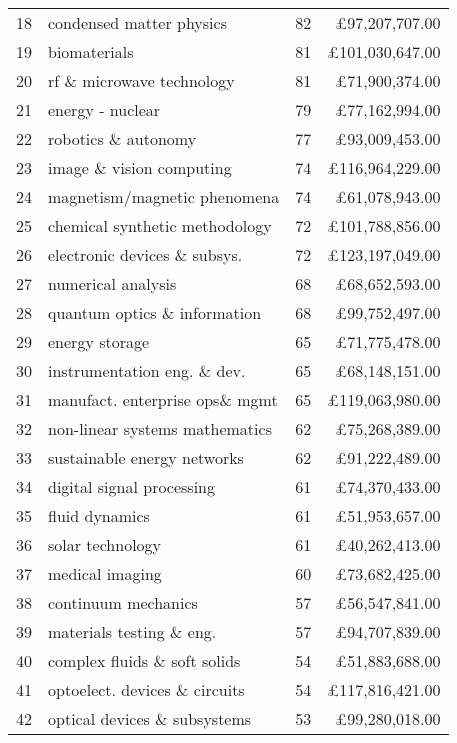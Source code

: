 \begin{spacing}{0.9}
\begin{longtable}[c]{r|>{\raggedleft\arraybackslash}m{6.5cm}|>{\raggedleft\arraybackslash}m{1.9cm}|r}
{18} & {condensed matter physics} & {82} & {\pounds97,207,707.00}\\
{19} & {biomaterials} & {81} & {\pounds101,030,647.00}\\
{20} & {rf \& microwave technology} & {81} & {\pounds71,900,374.00}\\
{21} & {energy - nuclear} & {79} & {\pounds77,162,994.00}\\
{22} & {robotics \& autonomy} & {77} & {\pounds93,009,453.00}\\
{23} & {image \& vision computing} & {74} & {\pounds116,964,229.00}\\
{24} & {magnetism/magnetic phenomena} & {74} & {\pounds61,078,943.00}\\
{25} & {chemical synthetic methodology} & {72} & {\pounds101,788,856.00}\\
{26} & {electronic devices \& subsys.} & {72} & {\pounds123,197,049.00}\\
{27} & {numerical analysis} & {68} & {\pounds68,652,593.00}\\
{28} & {quantum optics \& information} & {68} & {\pounds99,752,497.00}\\
{29} & {energy storage} & {65} & {\pounds71,775,478.00}\\
{30} & {instrumentation eng. \& dev.} & {65} & {\pounds68,148,151.00}\\
{31} & {manufact. enterprise ops\& mgmt} & {65} & {\pounds119,063,980.00}\\
{32} & {non-linear systems mathematics} & {62} & {\pounds75,268,389.00}\\
{33} & {sustainable energy networks} & {62} & {\pounds91,222,489.00}\\
{34} & {digital signal processing} & {61} & {\pounds74,370,433.00}\\
{35} & {fluid dynamics} & {61} & {\pounds51,953,657.00}\\
{36} & {solar technology} & {61} & {\pounds40,262,413.00}\\
{37} & {medical imaging} & {60} & {\pounds73,682,425.00}\\
{38} & {continuum mechanics} & {57} & {\pounds56,547,841.00}\\
{39} & {materials testing \& eng.} & {57} & {\pounds94,707,839.00}\\
{40} & {complex fluids \& soft solids} & {54} & {\pounds51,883,688.00}\\
{41} & {optoelect. devices \& circuits} & {54} & {\pounds117,816,421.00}\\
{42} & {optical devices \& subsystems} & {53} & {\pounds99,280,018.00}\\

\end{longtable}
\end{spacing}
